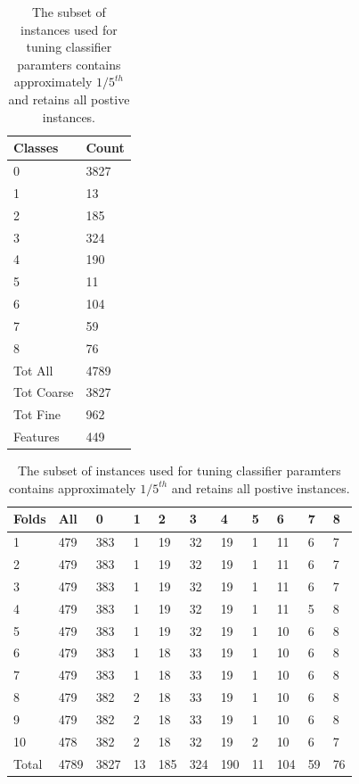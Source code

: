 \documentclass[ms]{nuthesis}
\begin{document}
\FloatBarrier
\begin{table}[!htb]
\centering
\begin{subtable}{.25\linewidth}
  \centering
  \begin{tabular}{|l||l|}\toprule
    Classes & Count \\ \midrule
    0 & 3827 \\
    1 & 13 \\
    2 & 185 \\
    3 & 324 \\
    4 & 190 \\
    5 & 11 \\
    6 & 104 \\
    7 & 59 \\
    8 & 76 \\ \midrule
    Tot All & 4789 \\
    Tot Coarse & 3827 \\
    Tot Fine & 962 \\
    Features & 449 \\ \bottomrule
  \end{tabular}
  \caption{Classes Subset}
  \label{tab:ClassesSub}
\end{subtable}%
\begin{subtable}{.75\linewidth}
\centering
  \begin{tabular}{|l||l||l||l||l||l||l||l||l||l||l|}\toprule
    Folds & All & 0 & 1 & 2 & 3 & 4 & 5 & 6 & 7 & 8 \\ \midrule
    1 & 479 & 383 & 1 & 19 & 32 & 19 & 1 & 11 & 6 & 7 \\
    2 & 479 & 383 & 1 & 19 & 32 & 19 & 1 & 11 & 6 & 7 \\
    3 & 479 & 383 & 1 & 19 & 32 & 19 & 1 & 11 & 6 & 7 \\
    4 & 479 & 383 & 1 & 19 & 32 & 19 & 1 & 11 & 5 & 8 \\
    5 & 479 & 383 & 1 & 19 & 32 & 19 & 1 & 10 & 6 & 8 \\
    6 & 479 & 383 & 1 & 18 & 33 & 19 & 1 & 10 & 6 & 8 \\
    7 & 479 & 383 & 1 & 18 & 33 & 19 & 1 & 10 & 6 & 8 \\
    8 & 479 & 382 & 2 & 18 & 33 & 19 & 1 & 10 & 6 & 8 \\
    9 & 479 & 382 & 2 & 18 & 33 & 19 & 1 & 10 & 6 & 8 \\
    10 & 478 & 382 & 2 & 18 & 32 & 19 & 2 & 10 & 6 & 7 \\ \midrule
    Total & 4789 & 3827 & 13 & 185 & 324 & 190 & 11 & 104 & 59 & 76 \\ \bottomrule
  \end{tabular}
  \caption{Folds Subset}
  \label{tab:PartitionsSubset}
  \end{subtable}
  \caption{The subset of instances used for tuning classifier paramters contains approximately
  $1/5^{th}$ and retains all postive instances.}
  \label{tab:subset}
\end{table}
\FloatBarrier
\end{document}
